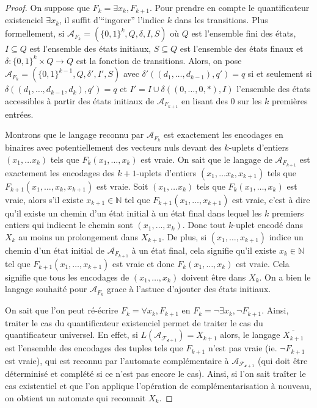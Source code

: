 \documentclass[12pt]{article}
\theoremstyle{break}
\begin{document}
\begin{proof}
On suppose que $F_k = \exists x_k, F_{k+1}$. Pour prendre en compte le quantificateur existenciel $\exists x_k$, il suffit d'``ingorer'' l'indice $k$ dans les transitions. Plus formellement, si $\mathcal{A}_{F_k}=(\{0, 1\}^k, Q, \delta, I, S)$ o\`u $Q$ est l'ensemble fini des états, $I\subseteq Q$ est l'ensemble des états initiaux, $S\subseteq Q$ est l'ensemble des états finaux et $\delta : \{0, 1\}^k \times Q \rightarrow Q$ est la fonction de transitions. Alors, on pose $\mathcal{A}_{F_k}=(\{0, 1\}^{k-1}, Q, \delta', I', S)$ avec $\delta'((d_1, \ldots, d_{k-1}), q') = q$ si et seulement si $\delta((d_1, \ldots, d_{k-1}, d_k), q') = q$ et $I' = I \cup \delta((0, \ldots, 0, *), I)$ l'ensemble des états accessibles à partir des états initiaux de $\mathcal{A}_{F_{k+1}}$ en lisant des $0$ sur les $k$ premières entrées.

Montrons que le langage reconnu par $\mathcal{A}_{F_k}$ est exactement les encodages en binaires avec potentiellement des vecteurs nuls devant des $k$-uplets d'entiers $(x_1, \ldots x_k)$ tels que $F_k(x_1, \ldots, x_k)$ est vraie. On sait que le langage de $\mathcal{A}_{F_{k+1}}$ est exactement les encodages des $k+1$-uplets d'entiers $(x_1, \ldots x_k, x_{k+1})$ tels que $F_{k+1}(x_1, \ldots, x_k, x_{k+1})$ est vraie. Soit $(x_1, \ldots x_k)$ tels que $F_k(x_1, \ldots, x_k)$ est vraie, alors s'il existe $x_{k+1} \in \mathbb{N}$ tel que $F_{k+1}(x_1, \ldots, x_{k+1})$ est vraie, c'est à dire qu'il existe un chemin d'un état initial à un état final dans lequel les $k$ premiers entiers qui indicent le chemin sont $(x_1, \ldots, x_k)$. Donc tout $k$-uplet encodé dans $X_k$ au moins un prolongement dans $X_{k+1}$. De plus, si $(x_1, \ldots, x_{k+1})$ indice un chemin d'un état initial de $\mathcal{A}_{F_{k+1}}$ à un état final, cela signifie qu'il existe $x_k \in \mathbb{N}$ tel que $F_{k+1}(x_1, \ldots, x_{k+1})$ est vraie et donc $F_k(x_1, \ldots, x_k)$ est vraie. Cela signifie que tous les encodages de $(x_1, \ldots, x_k)$ doivent \^etre dans $X_k$. On a bien le langage souhaité pour $\mathcal{A}_{F_k}$ grace à l'astuce d'ajouter des états initiaux.

On sait que l'on peut ré-écrire $F_{k}=\forall x_k, F_{k+1}$ en $F_{k}=\lnot \exists x_k, \lnot F_{k+1}$. Ainsi, traiter le cas du quantificateur existenciel permet de traiter le cas du quantificateur universel. En effet, si $L(\mathcal{A_{F_{k+1}}}) = X_{k+1}$ alors, le langage $\overline{X_{k+1}}$ est l'ensemble des encodages des tuples tels que $F_{k+1}$ n'est pas vraie (ie. $\lnot F_{k+1}$ est vraie), qui est reconnu par l'automate complémentaire à $\mathcal{A_{F_{k+1}}}$ (qui doit \^etre déterminisé et complété si ce n'est pas encore le cas). Ainsi, si l'on sait tra\^iter le cas existentiel et que l'on applique l'opération de complémentarisation à nouveau, on obtient un automate qui reconnait $X_k$.


\end{proof}
\end{document}
